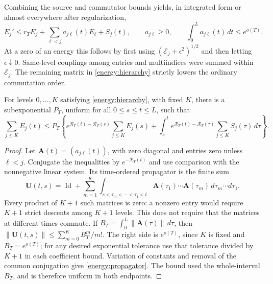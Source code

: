 Combining the source and commutator bounds yields, in integrated
form or almost everywhere after regularization,
\begin{equation}\label{energy:hierarchy}
 E_j'\le r_T E_j+\sum_{\ell<j}a_{j\ell}(t)E_\ell+S_j(t),
 \qquad a_{j\ell}\ge0,\qquad
 \int_0^L a_{j\ell}(t)\,dt\le e^{o(T)}.
\end{equation}
At a zero of an energy this follows by first using
\((\mathcal E_j+\epsilon^2)^{1/2}\) and then letting
\(\epsilon\downarrow0\). Same-level couplings among entries and
multiindices were summed within \(\mathcal E_j\). The remaining
matrix in \eqref{energy:hierarchy} strictly lowers the ordinary
commutation order.

\begin{lemma}\label{energy:volterra}
For levels \(0,\ldots,K\) satisfying \eqref{energy:hierarchy}, with
fixed \(K\), there is a subexponential \(P_T\), uniform for all
\(0\le s\le t\le L\), such that
\begin{equation}\label{energy:propagator}
 \sum_{j\le K}E_j(t)
 \le P_T\left\{
 e^{\mathcal R_T(t)-\mathcal R_T(s)}\sum_{j\le K}E_j(s)
 +\int_s^t e^{\mathcal R_T(t)-\mathcal R_T(\tau)}
                       \sum_{j\le K}S_j(\tau)\,d\tau\right\}.
\end{equation}
\end{lemma}
\begin{proof}
Let \(\mathbf A(t)=(a_{j\ell}(t))\), with zero diagonal and entries
zero unless \(\ell<j\). Conjugate the inequalities by
\(e^{-\mathcal R_T(t)}\) and use comparison with the nonnegative
linear system. Its time-ordered propagator is the finite sum
\[
 \mathbf U(t,s)=\operatorname{Id}
 +\sum_{m=1}^{K}
   \int_{s<\tau_m<\cdots<\tau_1<t}
       \mathbf A(\tau_1)\cdots\mathbf A(\tau_m)
                             \,d\tau_m\cdots d\tau_1.
\]
Every product of \(K+1\) such matrices is zero: a nonzero entry
would require \(K+1\) strict descents among \(K+1\) levels. This
does not require that the matrices at different times commute. If
\(B_T=\int_0^L\lVert\mathbf A(\tau)\rVert\,d\tau\), then
\(\lVert\mathbf U(t,s)\rVert\le\sum_{m=0}^K B_T^m/m!\).
The right side is \(e^{o(T)}\), since \(K\) is fixed and
\(B_T=e^{o(T)}\); for any desired exponential tolerance use that
tolerance divided by \(K+1\) in each coefficient bound. Variation
of constants and removal of the common conjugation give
\eqref{energy:propagator}. The bound used the whole-interval
\(B_T\), and is therefore uniform in both endpoints.
\end{proof}

